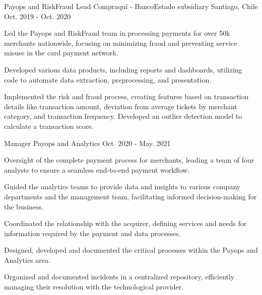 \begin{cventries}
  \cventrytwopositions
    {Payops and RiskFraud Lead}
    {Compraquí - BancoEstado subsidiary}
    {Santiago, Chile}
    {Oct. 2019 - Oct. 2020}
    {
      \begin{cvitems}
	      \item {Led the Payops and RiskFraud team in processing payments for over 50k merchants nationwide, focusing on minimizing fraud and preventing service misuse in the card payment network.}
	      \item {Developed various data products, including reports and dashboards, utilizing code to automate data extraction, preprocessing, and presentation.}
	      \item {Implemented the risk and fraud process, creating features based on transaction details like transaction amount, deviation from average tickets by merchant category, and transaction frequency. Developed an outlier detection model to calculate a transaction score.}
      \end{cvitems}
    }
    {Manager Payops and Analytics}
    {Oct. 2020 - May. 2021}
    {
      \begin{cvitems}
        \item {Oversight of the complete payment process for merchants, leading a team of four analysts to ensure a seamless end-to-end payment workflow.}
        \item {Guided the analytics teams to provide data and insights to various company departments and the management team, facilitating informed decision-making for the business.}
        \item {Coordinated the relationship with the acquirer, defining services and needs for information required by the payment and data processes.}
	\item {Designed, developed and documented the critical processes within the Payops and Analytics area.}
	\item {Organized and documented incidents in a centralized repository, efficiently managing their resolution with the technological provider.}
      \end{cvitems}
    }
    

\end{cventries}
